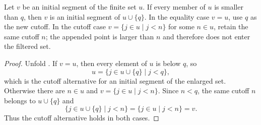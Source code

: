 \begin{helper}
Let $v$ be an initial segment of the finite set $u$.  If every member of
$u$ is smaller than $q$, then $v$ is an initial segment of
$u\cup\{q\}$.  In the equality case $v=u$, use $q$ as the new cutoff.
In the cutoff case
$v=\{j\in u\mid j<n\}$ for some $n\in u$, retain the same cutoff
$n$; the appended point is larger than $n$ and therefore does not enter
the filtered set.
\end{helper}
\begin{proof}
Unfold .  If $v=u$, then every element of $u$ is
below $q$, so
\[
 u=\{j\in u\cup\{q\}\mid j<q\},
\]
which is the cutoff alternative for an initial segment of the enlarged set.
Otherwise there are $n\in u$ and
$v=\{j\in u\mid j<n\}$.  Since $n<q$, the same cutoff $n$ belongs to
$u\cup\{q\}$ and
\[
 \{j\in u\cup\{q\}\mid j<n\}
 =\{j\in u\mid j<n\}=v.
\]
Thus the cutoff alternative holds in both cases.
\end{proof}
